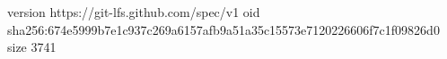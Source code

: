 version https://git-lfs.github.com/spec/v1
oid sha256:674e5999b7e1c937c269a6157afb9a51a35c15573e7120226606f7c1f09826d0
size 3741
